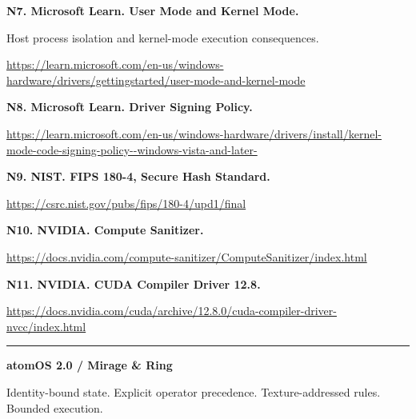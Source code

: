 \documentclass[11pt,a4paper]{article}
\begin{document}
\textbf{N7. Microsoft Learn. User Mode and Kernel Mode.}\par
Host process isolation and kernel-mode execution consequences.\par
\url{https://learn.microsoft.com/en-us/windows-hardware/drivers/gettingstarted/user-mode-and-kernel-mode}

\textbf{N8. Microsoft Learn. Driver Signing Policy.}\par
\url{https://learn.microsoft.com/en-us/windows-hardware/drivers/install/kernel-mode-code-signing-policy--windows-vista-and-later-}

\textbf{N9. NIST. FIPS 180-4, Secure Hash Standard.}\par
\url{https://csrc.nist.gov/pubs/fips/180-4/upd1/final}

\textbf{N10. NVIDIA. Compute Sanitizer.}\par
\url{https://docs.nvidia.com/compute-sanitizer/ComputeSanitizer/index.html}

\textbf{N11. NVIDIA. CUDA Compiler Driver 12.8.}\par
\url{https://docs.nvidia.com/cuda/archive/12.8.0/cuda-compiler-driver-nvcc/index.html}
\normalsize
\vfill
{\color{forest}\rule{\textwidth}{.6pt}}\par
{\sffamily\bfseries atomOS 2.0 / Mirage \& Ring}\par
{\small Identity-bound state. Explicit operator precedence. Texture-addressed rules. Bounded execution.}
\end{document}

